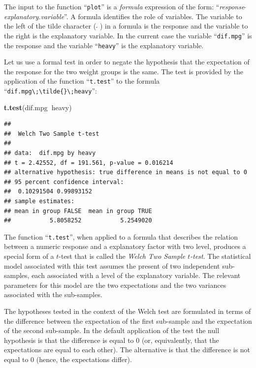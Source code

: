 \documentclass[]{krantz}
\makeatletter
\newenvironment{Shaded}{\begin{snugshade}}{\end{snugshade}}
\newcommand{\KeywordTok}[1]{\textcolor[rgb]{0.13,0.29,0.53}{\textbf{#1}}}
\newcommand{\OperatorTok}[1]{\textcolor[rgb]{0.81,0.36,0.00}{\textbf{#1}}}
\newcommand{\NormalTok}[1]{#1}
\newenvironment{kframe}{%
\medskip{}
\setlength{\fboxsep}{.8em}
 \def\at@end@of@kframe{}%
 \ifinner\ifhmode%
  \def\at@end@of@kframe{\end{minipage}}%
  \begin{minipage}{\columnwidth}%
 \fi\fi%
 \def\FrameCommand##1{\hskip\@totalleftmargin \hskip-\fboxsep
 \colorbox{shadecolor}{##1}\hskip-\fboxsep
     \hskip-\linewidth \hskip-\@totalleftmargin \hskip\columnwidth}%
 \MakeFramed {\advance\hsize-\width
   \@totalleftmargin\z@ \linewidth\hsize
   \@setminipage}}%
 {\par\unskip\endMakeFramed%
 \at@end@of@kframe}
\renewenvironment{Shaded}{\begin{kframe}}{\end{kframe}}
\theoremstyle{definition}
\theoremstyle{definition}
\theoremstyle{definition}
\theoremstyle{remark}
\makeatother
\begin{document}
The input to the function ``\texttt{plot}'' is a \emph{formula}
expression of the form:
``\emph{response\(\;\tilde{}\;\)explanatory.variable}''. A formula
identifies the role of variables. The variable to the left of the tilde
character (\(\;\tilde{}\;\)) in a formula is the response and the
variable to the right is the explanatory variable. In the current case
the variable ``\texttt{dif.mpg}'' is the response and the variable
``\texttt{heavy}'' is the explanatory variable.

Let us use a formal test in order to negate the hypothesis that the
expectation of the response for the two weight groups is the same. The
test is provided by the application of the function ``\texttt{t.test}''
to the formula
``\texttt{dif.mpg\textbackslash{};\textbackslash{}tilde\{\}\textbackslash{};heavy}'':

\begin{Shaded}
\begin{Highlighting}[]
\KeywordTok{t.test}\NormalTok{(dif.mpg}\OperatorTok{~}\NormalTok{heavy)}
\end{Highlighting}
\end{Shaded}

\begin{verbatim}
## 
##  Welch Two Sample t-test
## 
## data:  dif.mpg by heavy
## t = 2.42552, df = 191.561, p-value = 0.016214
## alternative hypothesis: true difference in means is not equal to 0
## 95 percent confidence interval:
##  0.10291504 0.99893152
## sample estimates:
## mean in group FALSE  mean in group TRUE 
##           5.8058252           5.2549020
\end{verbatim}

The function ``\texttt{t.test}'', when applied to a formula that
describes the relation between a numeric response and a explanatory
factor with two level, produces a special form of a \(t\)-test that is
called the \emph{Welch Two Sample \(t\)-test}. The statistical model
associated with this test assumes the present of two independent
sub-samples, each associated with a level of the explanatory variable.
The relevant parameters for this model are the two expectations and the
two variances associated with the sub-samples.

The hypotheses tested in the context of the Welch test are formulated in
terms of the difference between the expectation of the first sub-sample
and the expectation of the second sub-sample. In the default application
of the test the null hypothesis is that the difference is equal to 0
(or, equivalently, that the expectations are equal to each other). The
alternative is that the difference is not equal to 0 (hence, the
expectations differ).
\end{document}
